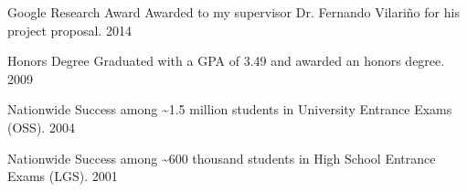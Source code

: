 
\begin{cvhonors}


  \cvhonor
    {Google Research Award} %
    {Awarded to my supervisor Dr. Fernando Vilari\~no for his project proposal.} %
    {2014} %

  \cvhonor
    {Honors Degree} %
    {Graduated with a GPA of 3.49 and awarded an honors degree.} %
    {2009} %

  \cvhonor
    {Nationwide Success} %
    {\textbf{} among \textasciitilde{}1.5 million students in University Entrance Exams (OSS).} %
    {2004} %

  \cvhonor
    {Nationwide Success} %
    {\textbf{} among \textasciitilde{}600 thousand students in High School Entrance Exams (LGS).} %
    {2001} %
\end{cvhonors}

